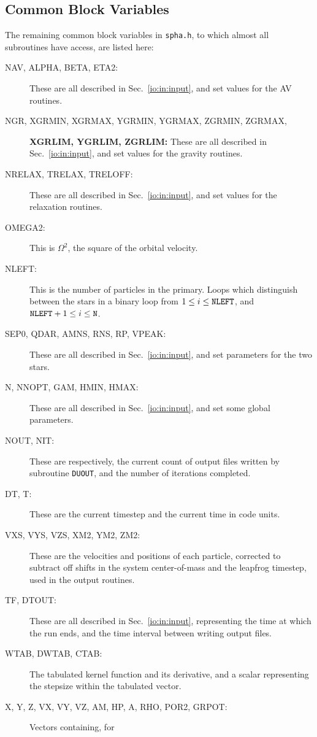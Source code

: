 \subsection{Common Block Variables}
The remaining common block variables in {\tt spha.h}, to which almost all
subroutines have access, are listed here:
\begin{description}
\item[NAV, ALPHA, BETA, ETA2:] These are all described in
Sec.~\ref{io:in:input}, and set values for the AV routines.
\item[NGR, XGRMIN, XGRMAX, YGRMIN, YGRMAX, ZGRMIN, ZGRMAX,]  
{\bf XGRLIM, YGRLIM, ZGRLIM:} 
These are all described in
Sec.~\ref{io:in:input}, and set values for the gravity routines.
\item[NRELAX, TRELAX, TRELOFF:] These are all described in
Sec.~\ref{io:in:input}, and set values for the relaxation routines.
\item[OMEGA2:] This is $\Omega^2$, the square of the orbital velocity.
\item[NLEFT:] This is the number of particles in the primary.  Loops
which distinguish between the stars in a binary loop from $1\le i \le
{\tt NLEFT}$, and ${\tt NLEFT}+1\le i \le{\tt N}$.
\item[SEP0, QDAR, AMNS, RNS, RP, VPEAK:] These are all described in
Sec.~\ref{io:in:input}, and set parameters for the two stars.
\item[N, NNOPT, GAM, HMIN, HMAX:] These are all described in
Sec.~\ref{io:in:input}, and set some global parameters.
\item[NOUT, NIT:] These are respectively, the current count of output
files written by subroutine {\tt DUOUT}, and the number of iterations
completed.  
\item[DT, T:] These are the current timestep and the current time in
code units.
\item[VXS, VYS, VZS, XM2, YM2, ZM2:] These are the velocities and positions
of each particle, corrected to subtract off shifts in the system
center-of-mass and the leapfrog timestep, used in the output routines.
\item[TF, DTOUT:] These are all described in
Sec.~\ref{io:in:input}, representing the time at which the run ends,
and the time interval between writing output files.
\item[WTAB, DWTAB, CTAB:]The tabulated kernel function and its
derivative, and a scalar representing the stepsize within the
tabulated vector.
\item[X, Y, Z, VX, VY, VZ, AM, HP, A, RHO, POR2, GRPOT:] Vectors containing, for

\end{description}
